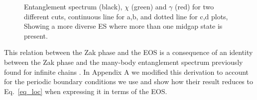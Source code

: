 \documentclass[twocolumn,amsmath,longbibliography,amssymb,superscriptaddress]{revtex4-1}
\begin{document}
\begin{figure}[h!]
	\centering
	\hspace{0mm}
	
	\caption{Entanglement spectrum (black), $\chi$ (green) and $\gamma$ (red) for two different cuts,  continuous line for a,b, and dotted line for c,d plots, Showing a more diverse ES where more than one midgap state is present. }
	\label{2}
\end{figure}
This relation between the Zak phase and the EOS is a consequence of an identity between the Zak phase and the many-body entanglement spectrum previously found for infinite chains \cite{Zaletel2014}.
In Appendix A we modified this derivation to account for the periodic boundary conditions we use and show how their result reduces to Eq.~\eqref{eq_loc} when expressing it in terms of the EOS.
\end{document}
